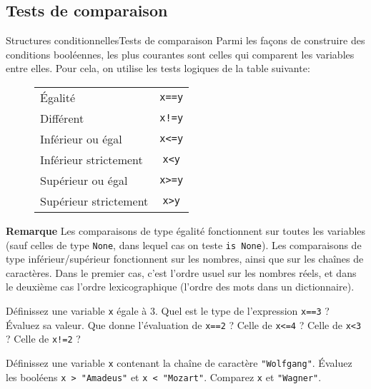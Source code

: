 \subsection{Tests de comparaison}

\begin{frame}[fragile]{Structures conditionnelles}{Tests de comparaison}
	Parmi les façons de construire des conditions booléennes, les plus courantes sont celles qui comparent les variables entre elles. Pour cela, on utilise les tests logiques de la table suivante:\pause
	\begin{figure}
		\centering
		\begin{tabular}{|l|c|}\hline
			Égalité & \lstinline|x==y| \\ 
			Différent & \lstinline|x!=y| \\ 
			Inférieur ou égal & \lstinline|x<=y| \\ 
			Inférieur strictement & \lstinline|x<y| \\ 
			Supérieur ou égal & \lstinline|x>=y| \\
			Supérieur strictement & \lstinline|x>y| \\ \hline
		\end{tabular}
	\end{figure}
	\pause
	
	\textbf{Remarque} Les comparaisons de type égalité fonctionnent sur toutes les variables (sauf celles de type \lstinline|None|, dans lequel cas on teste \lstinline|is None|). Les comparaisons de type inférieur/supérieur fonctionnent sur les nombres, ainsi que sur les chaînes de caractères. Dans le premier cas, c'est l'ordre usuel sur les nombres réels, et dans le deuxième cas l'ordre lexicographique (l'ordre des mots dans un dictionnaire).
\end{frame}


\begin{frame}
	\begin{exem}
		Définissez une variable \lstinline|x| égale à $3$. Quel est le type de l'expression \lstinline|x==3| ? Évaluez sa valeur. Que donne l'évaluation de \lstinline|x==2| ? Celle de \lstinline|x<=4| ? Celle de \lstinline|x<3| ? Celle de \lstinline|x!=2| ?
	\end{exem}

	\begin{exem}
		Définissez une variable \lstinline|x| contenant la chaîne de caractère \lstinline|"Wolfgang"|. Évaluez les booléens \lstinline|x > "Amadeus"| et \lstinline|x < "Mozart"|. Comparez \lstinline|x| et \lstinline|"Wagner"|.
	\end{exem}
\end{frame}


